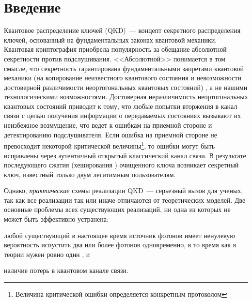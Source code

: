 \section*{Введение}				%

Квантовое распределение ключей (QKD)~--- концепт секретного распределения ключей, основанный на фундаментальных законах квантовой механики.
Квантовая криптография \cite{bennett1984QuacryPubkeydiscoitos, ekert1991QuacrybasBelthe, gisin2002Quacry, scarani2009secpraquakeydis, hughes2011Refquacry, lam2013QuacryConimp} приобрела популярность за обещание абсолютной секретности против подслушивания. <<Абсолютной>> понимается в том смысле, что секретность гарантирована
фундаментальными запретами квантовой механики (на копирование неизвестного квантового состояния и невозможности достоверной различимости неортогональных квантовых состояний) \cite{bennett1984QuacryPubkeydiscoitos, bennett1992Quacryusianytwononsta, wootters1982sinquacanbeclo, dieks1982CombyEPRdev}, 
а не нашими технологическими возможностями. Достоверная неразличимость неортогональных квантовых состояний приводит к тому, что любые попытки вторжения в канал связи с целью получения информации о передаваемых состояниях вызывают их неизбежное возмущение, что ведет к ошибкам на приемной стороне и детектированию подслушивателя.
Если ошибка на приемной стороне не превосходит некоторой критической величины\footnote{Величина критической ошибки определяется конкретным протоколом}, то ошибки могут быть исправлены через аутентичный открытый классический канал связи. В результате последующего сжатия (хеширования \cite{bennett1995Genpriamp}) очищенного ключа возникает секретный ключ, известный только двум легитимным пользователям.

Однако, \textit{практические} схемы реализации QKD~--- серьезный вызов для ученых, так как все реализации так или иначе отличаются от теоретических моделей. 
Две основные проблемы всех существующих реализаций, ни одна из которых не может быть эффективно устранена: 
\begin{inparaenum}[\itshape 1\upshape)]
\item любой существующий в настоящее время источник фотонов имеет ненулевую вероятность испустить два или более фотонов одновременно, в то время как в теории нужен ровно один \cite{lounis2000Sinphodemsinmolrootem, benjamin2000Sinphodem}, и
\item наличие потерь в квантовом канале связи.
\end{inparaenum}

